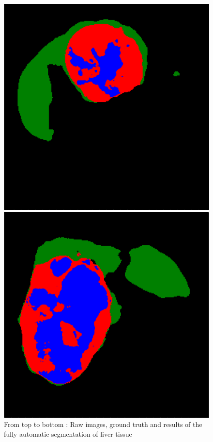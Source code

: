 \begin{figure}[!ht]
\begin{minipage}{4cm}
\end{minipage} \hspace{-0.3cm}
\begin{minipage}{4cm}
\includegraphics*[width=\linewidth]{./images/2_3_FullAuto_resized}
\end{minipage} \hspace{-0.3cm}
\begin{minipage}{4cm}
\includegraphics*[width=\linewidth]{./images/5_4_FullAuto_resized}
\end{minipage} 
\caption{From top to bottom : Raw images, ground truth and results of the fully automatic segmentation of liver tissue}
\label{FullAutoSeg}
\end{figure}


